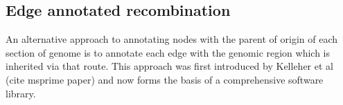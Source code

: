 \documentclass{article}
\begin{document}
\subsection*{Edge annotated recombination}

An alternative approach to annotating nodes with the parent of origin of each section of genome is
to annotate each edge with the genomic region which is inherited via that route. This approach
was first introduced by Kelleher et al (cite msprime paper) and now forms the basis of a comprehensive
software library.






\end{document}
